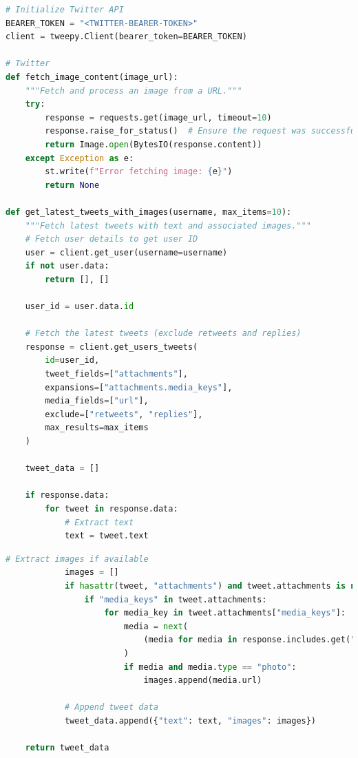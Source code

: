 
\begin{tcolorbox}[colback=gray!5!white, colframe=gray!80!black, boxrule=0.5pt, title=Twitter API call and post extraction]
    \begin{lstlisting}[language=Python]
# Initialize Twitter API
BEARER_TOKEN = "<TWITTER-BEARER-TOKEN>"
client = tweepy.Client(bearer_token=BEARER_TOKEN)

# Twitter
def fetch_image_content(image_url):
    """Fetch and process an image from a URL."""
    try:
        response = requests.get(image_url, timeout=10)
        response.raise_for_status()  # Ensure the request was successful
        return Image.open(BytesIO(response.content))
    except Exception as e:
        st.write(f"Error fetching image: {e}")
        return None

def get_latest_tweets_with_images(username, max_items=10):
    """Fetch latest tweets with text and associated images."""
    # Fetch user details to get user ID
    user = client.get_user(username=username)
    if not user.data:
        return [], []

    user_id = user.data.id

    # Fetch the latest tweets (exclude retweets and replies)
    response = client.get_users_tweets(
        id=user_id,
        tweet_fields=["attachments"],
        expansions=["attachments.media_keys"],
        media_fields=["url"],
        exclude=["retweets", "replies"],
        max_results=max_items
    )

    tweet_data = []

    if response.data:
        for tweet in response.data:
            # Extract text
            text = tweet.text
        \end{lstlisting}
    \end{tcolorbox}
    \begin{tcolorbox}[colback=gray!5!white, colframe=gray!80!black, boxrule=0.5pt, title=Twitter API call and post extraction]
        \begin{lstlisting}[language=Python]
            # Extract images if available
            images = []
            if hasattr(tweet, "attachments") and tweet.attachments is not None:
                if "media_keys" in tweet.attachments:
                    for media_key in tweet.attachments["media_keys"]:
                        media = next(
                            (media for media in response.includes.get("media", []) if media["media_key"] == media_key), None
                        )
                        if media and media.type == "photo":
                            images.append(media.url)

            # Append tweet data
            tweet_data.append({"text": text, "images": images})

    return tweet_data
    \end{lstlisting}
\end{tcolorbox}

